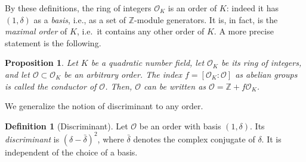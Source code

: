 \documentclass[10pt]{article}
\theoremstyle{plain}
\newtheorem{proposition}[theorem]{Proposition}
\theoremstyle{definition}
\newtheorem{definition}[theorem]{Definition}
\def\O{\ensuremath{\mathcal{O}}}
\begin{document}
By these definitions, the ring of integers $\O_K$ is an order of $K$:
indeed it has $(1,δ)$ as a \emph{basis}, i.e., as a set of $ℤ$-module
generators. %
It is, in fact, is the \emph{maximal order} of $K$, i.e.\ it contains
any other order of $K$. %
A more precise statement is the following.

\begin{proposition}
  Let $K$ be a quadratic number field, let $\O_K$ be its ring of
  integers, and let $\O ⊂ \O_K$ be an arbitrary order. %
  The index $f=[\O_K:\O]$ as abelian groups is called the
  \emph{conductor of $\O$}. %
  Then, $\O$ can be written as $\O=ℤ+f\O_K$. %
\end{proposition}  

We generalize the notion of discriminant to any order.

\begin{definition}[Discriminant]
  Let $\O$ be an order with basis $(1,δ)$. %
  Its \emph{discriminant} is $(δ-\bar{δ})^2$, where
  $\bar{δ}$ denotes the complex conjugate of $δ$. %
  It is independent of the choice of a basis.
\end{definition}
\end{document}
